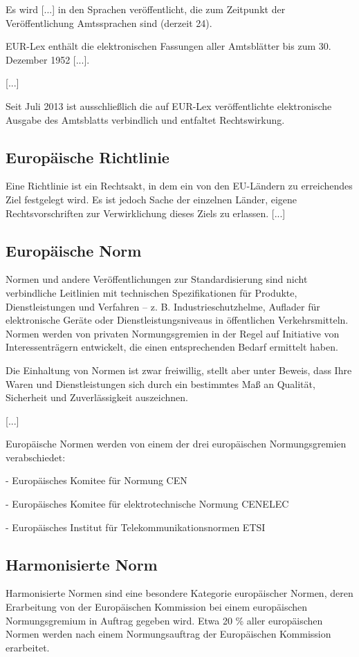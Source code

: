 Es wird [...] in den Sprachen veröffentlicht, die zum Zeitpunkt der Veröffentlichung Amtssprachen sind (derzeit 24).

EUR-Lex enthält die elektronischen Fassungen aller Amtsblätter bis zum 30. Dezember 1952 [...].

[...]

Seit Juli 2013 ist ausschließlich die auf EUR-Lex veröffentlichte elektronische Ausgabe des Amtsblatts verbindlich und entfaltet Rechtswirkung. \parencite{eurlex_amtsblatteu_2025}

\subsection{Europäische Richtlinie}
Eine Richtlinie ist ein Rechtsakt, in dem ein von den EU-Ländern zu erreichendes Ziel festgelegt wird. Es ist jedoch Sache der einzelnen Länder, eigene Rechtsvorschriften zur Verwirklichung dieses Ziels zu erlassen. [...] \parencite{eu_richtlinien_2025}

\subsection{Europäische Norm}
Normen und andere Veröffentlichungen zur Standardisierung sind nicht verbindliche Leitlinien mit technischen Spezifikationen für Produkte, Dienstleistungen und Verfahren – z. B. Industrieschutzhelme, Auflader für elektronische Geräte oder Dienstleistungsniveaus in öffentlichen Verkehrsmitteln. Normen werden von privaten Normungsgremien in der Regel auf Initiative von Interessenträgern entwickelt, die einen entsprechenden Bedarf ermittelt haben.

Die Einhaltung von Normen ist zwar freiwillig, stellt aber unter Beweis, dass Ihre Waren und Dienstleistungen sich durch ein bestimmtes Maß an Qualität, Sicherheit und Zuverlässigkeit auszeichnen.

[...]

Europäische Normen werden von einem der drei europäischen Normungsgremien verabschiedet:

- Europäisches Komitee für Normung CEN

- Europäisches Komitee für elektrotechnische Normung CENELEC

- Europäisches Institut für Telekommunikationsnormen ETSI

\parencite{eu_norm_2025}

\subsection{Harmonisierte Norm}
Harmonisierte Normen sind eine besondere Kategorie europäischer Normen, deren Erarbeitung von der Europäischen Kommission bei einem europäischen Normungsgremium in Auftrag gegeben wird. Etwa 20 \% aller europäischen Normen werden nach einem Normungsauftrag der Europäischen Kommission erarbeitet.

